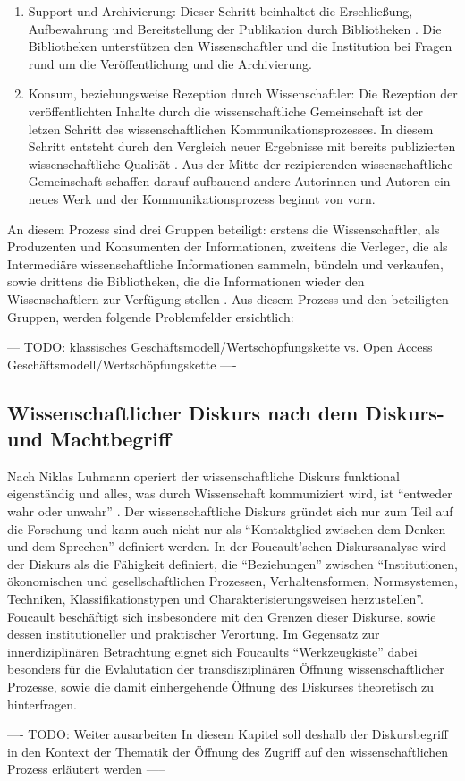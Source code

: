 \begin{enumerate}
\item Support und Archivierung: 
Dieser Schritt beinhaltet die Erschließung, Aufbewahrung und Bereitstellung der Publikation durch Bibliotheken \cite{schirmbacher_2009_wisspub}. Die Bibliotheken unterstützen den Wissenschaftler und die Institution bei Fragen rund um die Veröffentlichung und die Archivierung.
\item Konsum, beziehungsweise Rezeption durch Wissenschaftler: 
Die Rezeption der veröffentlichten Inhalte durch die wissenschaftliche Gemeinschaft \cite{schirmbacher_2009_wisspub} ist der letzen Schritt des wissenschaftlichen Kommunikationsprozesses. In diesem Schritt entsteht durch den Vergleich neuer Ergebnisse mit bereits publizierten wissenschaftliche Qualität \cite{umstatter_2007_qualitatssicherung}. Aus der Mitte der rezipierenden wissenschaftliche Gemeinschaft schaffen darauf aufbauend andere Autorinnen und Autoren ein neues Werk \cite{cite:11k} \cite{schirmbacher_2009_wisspub} und der Kommunikationsprozess beginnt von vorn.
\end{enumerate}

An diesem Prozess sind drei Gruppen beteiligt: erstens die Wissenschaftler, als Produzenten und Konsumenten der Informationen, zweitens die Verleger, die als Intermediäre wissenschaftliche Informationen sammeln, bündeln und verkaufen, sowie drittens die Bibliotheken, die die Informationen wieder den Wissenschaftlern zur Verfügung stellen \cite{Odlyzko_1997}. Aus diesem Prozess und den beteiligten Gruppen, werden folgende Problemfelder ersichtlich:

--- TODO: klassisches Geschäftsmodell/Wertschöpfungskette vs. Open Access Geschäftsmodell/Wertschöpfungskette \cite{Hess_2006} ----

\subsection{Wissenschaftlicher Diskurs nach dem Diskurs- und Machtbegriff}
Nach Niklas Luhmann operiert der wissenschaftliche Diskurs funktional eigenständig und alles, was durch Wissenschaft kommuniziert wird, ist “entweder wahr oder unwahr” \cite{Luhmann1998}. Der wissenschaftliche Diskurs gründet sich nur zum Teil auf die Forschung und kann auch nicht nur als “Kontaktglied zwischen dem Denken und dem Sprechen” \cite{foucault_ordnung_2003} definiert werden. In der Foucault'schen Diskursanalyse wird der Diskurs als die Fähigkeit definiert, die “Beziehungen” zwischen “Institutionen, ökonomischen und gesellschaftlichen Prozessen, Verhaltensformen, Normsystemen, Techniken, Klassifikationstypen und Charakterisierungsweisen herzustellen”\cite{foucault_archaologie_1981}. Foucault beschäftigt sich insbesondere mit den Grenzen dieser Diskurse, sowie dessen institutioneller und praktischer Verortung. Im Gegensatz zur innerdiziplinären Betrachtung eignet sich Foucaults “Werkzeugkiste”\cite{Honneth_2003} dabei besonders für die Evlalutation der transdisziplinären Öffnung wissenschaftlicher Prozesse, sowie die damit einhergehende Öffnung des Diskurses theoretisch zu hinterfragen. 

---- TODO: Weiter ausarbeiten In diesem Kapitel soll deshalb der Diskursbegriff in den Kontext der Thematik der Öffnung des Zugriff auf den wissenschaftlichen Prozess erläutert werden -----
